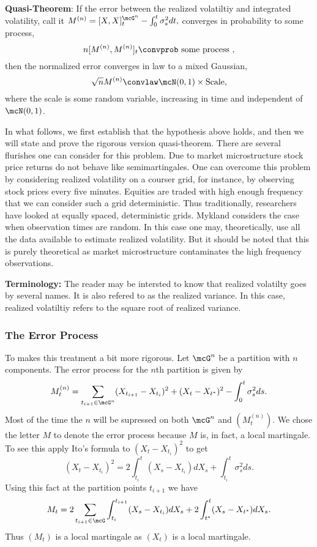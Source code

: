 \documentclass{report}
\begin{document}
\vspace{12pt} \noindent
\textbf{Quasi-Theorem}: If the error between the realized volatiltiy
and integrated volatility, call it 
\(
M^{(n)} =  [X,X]^{\mcG^n}_t - \int_0^t \sigma_s^2 dt,
\)
converges in probability to some process,
\begin{equation}
\label{hypothesis}
n [M^{(n)},M^{(n)}]_t \convprob \textmd{ some process },
\end{equation}
then the normalized error converges in law to a mixed Gaussian,
\begin{equation}
\label{conclusion}
\sqrt{n} M^{(n)} \convlaw \mcN(0,1) \times \textmd{Scale},
\end{equation}
where the scale is some random variable, increasing in time and
independent of $\mcN(0,1)$.

\vspace{10pt} \noindent
In what follows, we first establish that the hypothesis above holds,
and then we will state and prove the rigorous version quasi-theorem. 
There are several flurishes one can consider for this problem.  Due to
market microstructure stock price returns do not behave like
semimartingales.  One can overcome this problem by considering
realized volatility on a courser grid, for instance, by observing
stock prices every five minutes.  Equities are traded with high enough
frequency that we can consider such a grid deterministic.  Thus
traditionally, researchers have looked at equally spaced,
deterministic grids.  Mykland considers the case when observation
times are random.  In this case one may, theoretically, use all the
data available to estimate realized volatility.  But it should be
noted that this is purely theoretical as market microstructure
contaminates the high frequency observations.

\vspace{10pt} \noindent \textbf{Terminology:}  The reader may be
intersted to know that realized volatilty goes by several names.  It
is also refered to as the realized variance.  In this case, realized
volatiltiy refers to the square root of realized variance.

\subsubsection{The Error Process}

To makes this treatment a bit more rigorous.  Let $\mcG^n$ be a
partition with $n$ components.  The error process for the $n$th
partition is given by
\[
M^{(n)}_t =  \sum_{t_{i+1} \in \mcG^n} (X_{t_{i+1}} - X_{t_i})^2 +
(X_{t} - X_{t^*})^2 - \int_0^t \sigma_s^2 ds.
\]
Most of the time the $n$ will be supressed on both $\mcG^n$ and
$(M_t^{(n)})$.  We chose the letter $M$ to denote the error process
because $M$ is, in fact, a local martingale.  To see this apply Ito's
formula to $(X_t - X_{t_i})^2$ to get
\[
(X_t - X_{t_i})^2 = 2 \int_{t_i}^t (X_s - X_{t_i}) dX_s + \int_{t_i}^t
\sigma_s^2 ds.
\]
Using this fact at the partition points $t_{i+1}$ we have
\[
M_t = 2  \sum_{t_{i+1} \in \mcG} \int_{t_i}^{t_{i+1}} (X_s - X_{t_i})
dX_s + 2 \int_{t^*}^t (X_s - X_{t^*}) dX_s.
\]
Thus $(M_t)$ is a local martingale as $(X_t)$ is a local martingale. 
\end{document}
